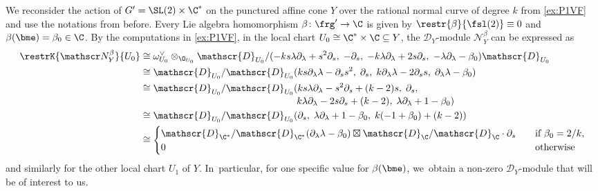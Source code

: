 \begin{exa} \label{ex:P1NBeta}
We reconsider the action of $G' = \SL(2) \times \C^*$ on the punctured affine cone $Y$ over the rational normal curve of degree $k$ from \cref{ex:P1VF} and use the notations from before. Every Lie algebra homomorphism $\beta \colon \frg' \to \C$ is given by $\restr{\beta}{\fsl(2)} \equiv 0$ and $\beta(\bme) = \beta_0 \in \C$. By the computations in \cref{ex:P1VF}, in the local chart $U_0 \cong \C^* \times \C \subseteq Y$, the $\mathscr D_Y$\nobreakdash-mod\-ule $\mathscr{N}_Y^\beta$ can be expressed as
\begin{align*}
\restrK{\mathscr N_Y^\beta}{U_0} &\cong
\omega_{U_0}^\vee \otimes_{\O_{U_0}} \mathscr{D}_{U_0}/(
-ks \lambda \partial_\lambda + s^2 \partial_s, \;
-\partial_s, \;
-k \lambda \partial_\lambda + 2 s \partial_s, \;
-\lambda \partial_\lambda - \beta_0)\mathscr{D}_{U_0} \\
&\cong \mathscr{D}_{U_0}/\mathscr{D}_{U_0}(
ks \partial_\lambda \lambda - \partial_s s^2, \;
\partial_s, \;
k \partial_\lambda \lambda - 2 \partial_s s, \;
\partial_\lambda \lambda - \beta_0) \\
&\cong \mathscr{D}_{U_0}/\mathscr{D}_{U_0}(
ks \lambda \partial_\lambda - s^2 \partial_s + (k-2)s, \;
\partial_s, \\[-3pt]
& \hspace*{5.7cm} k \lambda \partial_\lambda - 2 s \partial_s + (k-2), \;
\lambda \partial_\lambda + 1 - \beta_0) \\
&\cong \mathscr{D}_{U_0}/\mathscr{D}_{U_0}(
\partial_s, \;
\lambda \partial_\lambda + 1 - \beta_0, \; k(-1+\beta_0)+(k-2)) \\
&\cong
\begin{cases}
\mathscr{D}_{\C^*}/\mathscr{D}_{\C^*}(\partial_\lambda \lambda - \beta_0) \boxtimes \mathscr{D}_{\C}/\mathscr{D}_{\C} \cdot \partial_s
\quad &\text{if } \beta_0 = 2/k, \\
0 &\text{otherwise}
\end{cases}
\end{align*}
and similarly for the other local chart $U_1$ of $Y$. In~particular, for one specific value for $\beta(\bme)$, we~obtain a non-zero $\mathscr D_Y$\nobreakdash-mod\-ule that will be of interest to us.


\end{exa}
